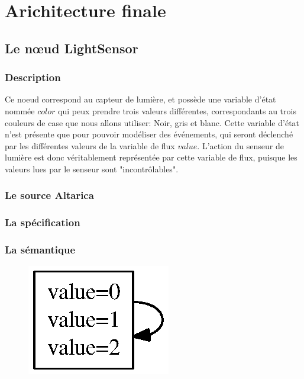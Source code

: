 \section{Arichitecture finale}

  \subsection{Le n\oe{}ud LightSensor}

   \subsubsection{Description}
   Ce noeud correspond au capteur de lumière, et possède une variable
   d'état nommée $color$ qui   peux prendre trois valeurs différentes,
   correspondants au trois couleurs de case que nous allons utiliser:
   Noir, gris et blanc. Cette variable d'état n'est présente que pour
   pouvoir modéliser des événements, qui seront déclenché par les
   différentes valeurs de la variable de flux $value$. L'action du
   senseur de lumière est donc véritablement représentée par cette
   variable de flux, puisque les valeurs lues par le senseur sont
   "incontrôlables".

   \subsubsection{Le source Altarica}
   
   
   \subsubsection{La spécification}
   

   \subsubsection{La sémantique}
   \begin{figure}[!ht]
    \begin{center}
     \includegraphics{../src/altarica/LightSensor.eps}
    \end{center}
   \end{figure}
   
